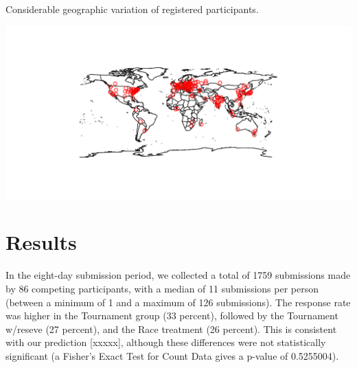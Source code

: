 \documentclass[12pt,]{article}
\theoremstyle{plain} %
\begin{document}
Considerable geographic variation of registered participants.

\includegraphics{Figures/unnamed-chunk-9-1.pdf}

\clearpage

\section{Results}\label{results}

In the eight-day submission period, we collected a total of 1759
submissions made by 86 competing participants, with a median of 11
submissions per person (between a minimum of 1 and a maximum of 126
submissions). The response rate was higher in the Tournament group (33
percent), followed by the Tournament w/reseve (27 percent), and the Race
treatment (26 percent). This is consistent with our prediction
{[}xxxxx{]}, although these differences were not statistically
significant (a Fisher's Exact Test for Count Data gives a p-value of
0.5255004).
\end{document}
